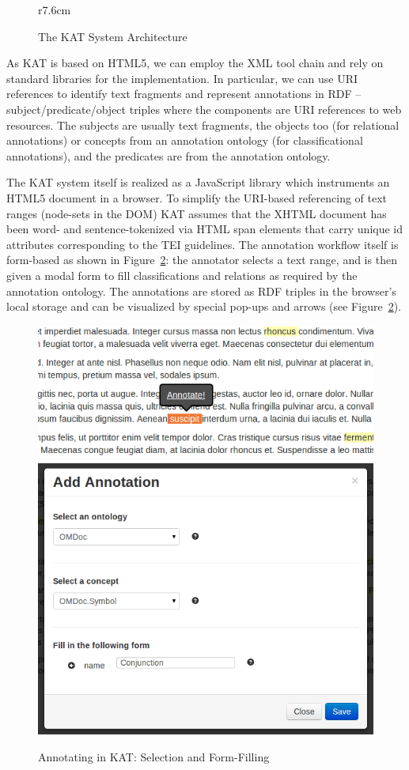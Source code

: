 \documentclass{llncs}
\def\KAT{\textsf{KAT}\xspace}
\begin{document}
\begin{figure}r{7.6cm}\vspace*{-2em}
\def\localxscale{.85}\def\localyscale{1.35}
\caption{The \KAT System Architecture}\label{fig:kat-arch}\vspace*{-1em}
\end{figure}
As \KAT is based on HTML5, we can employ the XML tool chain and rely on standard libraries
for the implementation. In particular, we can use URI references to identify text
fragments and represent annotations in RDF -- subject/predicate/object triples where the
components are URI references to web resources. The subjects are usually text fragments,
the objects too (for relational annotations) or concepts from an annotation ontology (for
classificational annotations), and the predicates are from the annotation ontology.

The \KAT system itself is realized as a JavaScript library which instruments an HTML5
document in a browser. To simplify the URI-based referencing of text ranges (node-sets in
the DOM) \KAT assumes that the XHTML document has been word- and sentence-tokenized via
HTML \textsf{span} elements that carry unique \textsf{id} attributes corresponding to the
TEI guidelines. The annotation workflow itself is
form-based as shown in Figure~\ref{fig:kat-annotate}: the annotator selects a text range,
and is then given a modal form to fill classifications and relations as required by the
annotation ontology. The annotations are stored as RDF triples in the browser's local
storage and can be visualized by special pop-ups and arrows (see
Figure~\ref{fig:kat-annotate}).

\begin{figure}[ht]\centering
  \includegraphics[width=.57\textwidth]{../PIC/annotate}\quad
  \includegraphics[width=.37\textwidth]{../PIC/add-symbol}
  \caption{Annotating in \KAT: Selection and Form-Filling}\label{fig:kat-annotate}
\end{figure}
\end{document}
